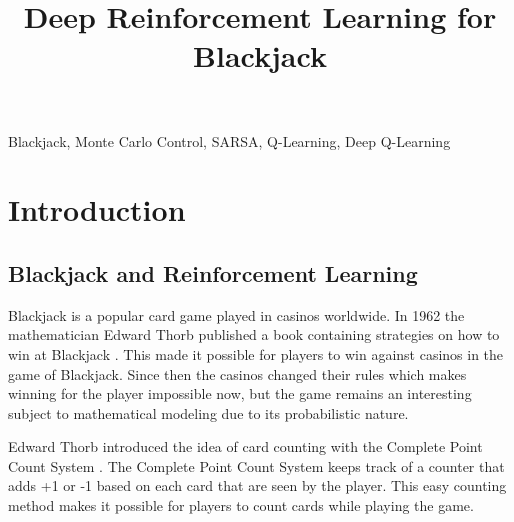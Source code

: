 \documentclass[conference]{IEEEtran}
\begin{document}
\title{Deep Reinforcement Learning for Blackjack}

\author{
}
\maketitle



\begin{abstract}
\end{abstract}

\begin{IEEEkeywords}
	Blackjack, Monte Carlo Control, SARSA, Q-Learning, Deep Q-Learning
\end{IEEEkeywords}

\section{Introduction}
\subsection{Blackjack and Reinforcement Learning} 
Blackjack is a popular card game played in casinos worldwide. 
In 1962 the mathematician Edward Thorb published a book containing strategies on how to win at Blackjack \cite{b1}. 
This made it possible for players to win against casinos in the game of Blackjack.
Since then the casinos changed their rules which makes winning for the player impossible now, but the game remains an interesting subject to mathematical modeling due to its probabilistic nature.    

Edward Thorb introduced the idea of card counting with the Complete Point Count System \cite{b1}.
The Complete Point Count System keeps track of a counter that adds +1 or -1 based on each card that are seen by the player. 
This easy counting method makes it possible for players to count cards while playing the game. 
\end{document}
